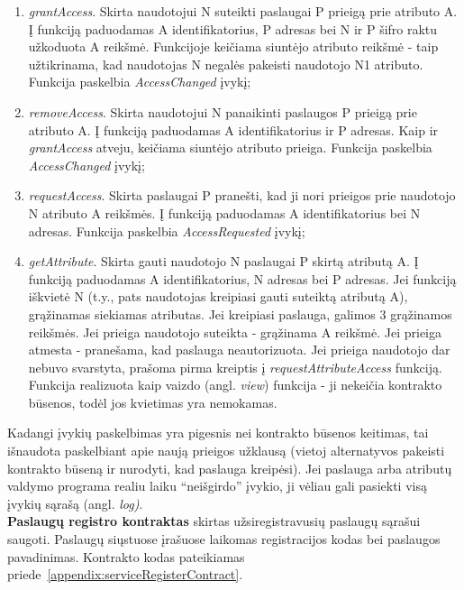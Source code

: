 \begin{enumerate}
    \item \textit{grantAccess}. Skirta naudotojui N suteikti paslaugai P prieigą prie atributo A. Į funkciją paduodamas A identifikatorius,
    P adresas bei N ir P šifro raktu užkoduota A reikšmė. Funkcijoje keičiama siuntėjo atributo reikšmė - taip užtikrinama, kad naudotojas N
    negalės pakeisti naudotojo N1 atributo. Funkcija paskelbia \textit{AccessChanged} įvykį;
    \item \textit{removeAccess}. Skirta naudotojui N panaikinti paslaugos P prieigą prie atributo A. Į funkciją paduodamas A identifikatorius ir P
    adresas. Kaip ir \textit{grantAccess} atveju, keičiama siuntėjo atributo prieiga. Funkcija paskelbia \textit{AccessChanged} įvykį;
    \item \textit{requestAccess}. Skirta paslaugai P pranešti, kad ji nori prieigos prie naudotojo N atributo A reikšmės. Į funkciją paduodamas A identifikatorius
    bei N adresas. Funkcija paskelbia \textit{AccessRequested} įvykį;
    \item \textit{getAttribute}. Skirta gauti naudotojo N paslaugai P skirtą atributą A. Į funkciją paduodamas A identifikatorius, N adresas bei
    P adresas. Jei funkciją iškvietė N (t.y., pats naudotojas kreipiasi gauti suteiktą atributą A), grąžinamas siekiamas atributas. Jei kreipiasi paslauga,
    galimos 3 grąžinamos reikšmės. Jei prieiga naudotojo suteikta - grąžinama A reikšmė. Jei prieiga atmesta - pranešama, kad paslauga neautorizuota. Jei
    prieiga naudotojo dar nebuvo svarstyta, prašoma pirma kreiptis į \textit{requestAttributeAccess} funkciją.\\
    Funkcija realizuota kaip vaizdo (angl. \textit{view}) funkcija - ji nekeičia kontrakto būsenos, todėl jos kvietimas yra nemokamas.
\end{enumerate}

Kadangi įvykių paskelbimas yra pigesnis nei kontrakto būsenos keitimas, tai išnaudota paskelbiant apie naują prieigos užklausą (vietoj alternatyvos pakeisti
kontrakto būseną ir nurodyti, kad paslauga kreipėsi). Jei paslauga arba atributų valdymo programa realiu laiku \enquote{neišgirdo} įvykio, ji vėliau gali
pasiekti visą įvykių sąrašą (angl. \textit{log)}.\\

\textbf{Paslaugų registro kontraktas} skirtas užsiregistravusių paslaugų sąrašui saugoti. Paslaugų siųstuose įrašuose laikomas
registracijos kodas bei paslaugos pavadinimas.
Kontrakto kodas pateikiamas priede\hypertarget{appendix:serviceRegisterContract}{~\ref{appendix:serviceRegisterContract}}.

